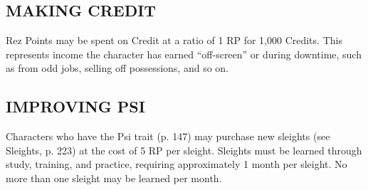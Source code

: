  \subsection{MAKING CREDIT}
Rez Points may be spent on Credit at a ratio
of 1 RP for 1,000 Credits. This represents
income the character has earned “off-screen”
or during downtime, such as from odd jobs,
selling off possessions, and so on.

 \subsection{IMPROVING PSI}
Characters who have the Psi trait (p. 147)
may purchase new sleights (see Sleights, p.
223) at the cost of 5 RP per sleight. Sleights
must be learned through study, training, and
practice, requiring approximately 1 month
per sleight. No more than one sleight may be
learned per month.



